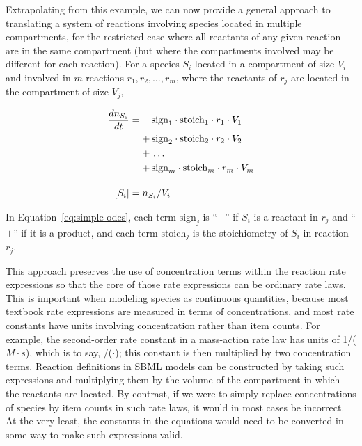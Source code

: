 Extrapolating from this example, we can now provide a general
approach to translating a system of reactions involving species
located in multiple compartments, for the restricted case where
all reactants of any given reaction are in the same compartment
(but where the compartments involved may be different for each
reaction).  For a species $S_i$ located in a compartment of size
$V_i$ and involved in $m$ reactions $r_1, r_2, \ldots, r_m$, where
the reactants of $r_j$ are located in the compartment of size
$V_j$,
\begin{linenomath}
\begin{equation} \label{eq:simple-odes}
  \begin{split}
    \frac{dn_{S_i}}{dt} &= \relphantom{+}\,\text{sign}_1 \cdot \text{stoich}_1 \cdot r_1 \cdot V_1\\
    &\relphantom{=} +\, \text{sign}_2 \cdot \text{stoich}_2 \cdot r_2 \cdot V_2\\
    &\relphantom{=} +\, \ldots \\
    &\relphantom{=} +\, \text{sign}_m \cdot \text{stoich}_m \cdot r_m \cdot V_m\\
    \\[-4pt]
    [S_i] &= n_{S_i}/V_i
  \end{split}
\end{equation}
\end{linenomath}
In Equation~\eqref{eq:simple-odes}, each term $\text{sign}_j$ is
``$-$'' if $S_i$ is a reactant in $r_j$ and ``$+$'' if it is a
product, and each term $\text{stoich}_j$ is the stoichiometry of
$S_i$ in reaction $r_j$.

This approach preserves the use of concentration terms within the
reaction rate expressions so that the core of those rate
expressions can be ordinary rate laws.  This is important when
modeling species as continuous quantities, because most textbook
rate expressions are measured in terms of concentrations, and most
rate constants have units involving concentration rather than item
counts.  For example, the second-order rate constant in a
mass-action rate law has units of 1/($M \cdot s$), which is to
say,
/($\cdot$);
this constant is then multiplied by two concentration terms.
Reaction definitions in SBML models can be constructed by taking
such expressions and multiplying them by the volume of the
compartment in which the reactants are located.  By contrast, if
we were to simply replace concentrations of species by item counts
in such rate laws, it would in most cases be incorrect.  At the
very least, the constants in the equations would need to be
converted in some way to make such expressions valid.

